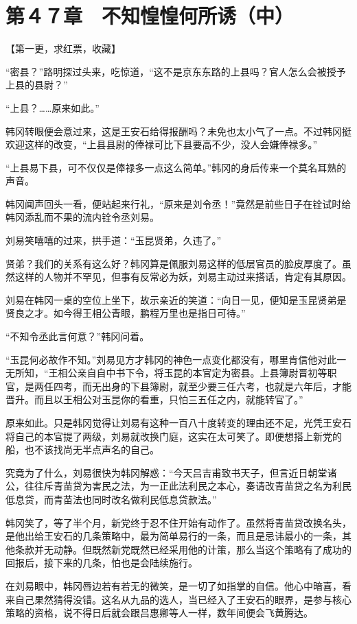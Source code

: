\section{第４７章　不知惶惶何所诱（中）}

【第一更，求红票，收藏】

“密县？”路明探过头来，吃惊道，“这不是京东东路的上县吗？官人怎么会被授予上县的县尉？”

“上县？……原来如此。”

韩冈转眼便会意过来，这是王安石给得报酬吗？未免也太小气了一点。不过韩冈挺欢迎这样的改变，“上县县尉的俸禄可比下县要高不少，没人会嫌俸禄多。”

“上县易下县，可不仅仅是俸禄多一点这么简单。”韩冈的身后传来一个莫名耳熟的声音。

韩冈闻声回头一看，便站起来行礼，“原来是刘令丞！”竟然是前些日子在铨试时给韩冈添乱而不果的流内铨令丞刘易。

刘易笑嘻嘻的过来，拱手道：“玉昆贤弟，久违了。”

贤弟？我们的关系有这么好？韩冈算是佩服刘易这样的低层官员的脸皮厚度了。虽然这样的人物并不罕见，但事有反常必为妖，刘易主动过来搭话，肯定有其原因。

刘易在韩冈一桌的空位上坐下，故示亲近的笑道：“向日一见，便知是玉昆贤弟是贤良之才。如今得王相公青眼，鹏程万里也是指日可待。”

“不知令丞此言何意？”韩冈问着。

“玉昆何必故作不知。”刘易见方才韩冈的神色一点变化都没有，哪里肯信他对此一无所知，“王相公亲自自中书下令，将玉昆的本官定为密县。上县簿尉晋初等职官，是两任四考，而无出身的下县簿尉，就至少要三任六考，也就是六年后，才能晋升。而且以王相公对玉昆你的看重，只怕三五任之内，就能转官了。”

原来如此。只是韩冈觉得让刘易有这种一百八十度转变的理由还不足，光凭王安石将自己的本官提了两级，刘易就改换门庭，这实在太可笑了。即便想搭上新党的船，也不该找尚无半点声名的自己。

究竟为了什么，刘易很快为韩冈解惑：“今天吕吉甫致书天子，但言近日朝堂诸公，往往斥青苗贷为害民之法，为一正此法利民之本心，奏请改青苗贷之名为利民低息贷，而青苗法也同时改名做利民低息贷款法。”

韩冈笑了，等了半个月，新党终于忍不住开始有动作了。虽然将青苗贷改换名头，是他出给王安石的几条策略中，最为简单易行的一条，而且是忌讳最小的一条，其他条款并无动静。但既然新党既然已经采用他的计策，那么当这个策略有了成功的回报后，接下来的几条，怕也是会陆续施行。

在刘易眼中，韩冈唇边若有若无的微笑，是一切了如指掌的自信。他心中暗喜，看来自己果然猜得没错。这名从九品的选人，当已经入了王安石的眼界，是参与核心策略的资格，说不得日后就会跟吕惠卿等人一样，数年间便会飞黄腾达。

